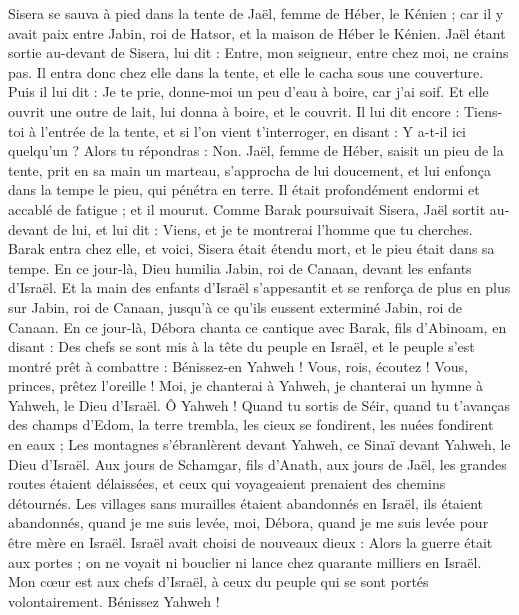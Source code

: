 \begin{multicols}{2}
Sisera se sauva à pied dans la tente de Jaël, femme de Héber, le Kénien ; car il y avait paix entre Jabin, roi de Hatsor, et la maison de Héber le Kénien.
Jaël étant sortie au-devant de Sisera, lui dit : Entre, mon seigneur, entre chez moi, ne crains pas. Il entra donc chez elle dans la tente, et elle le cacha sous une couverture.
Puis il lui dit : Je te prie, donne-moi un peu d'eau à boire, car j'ai soif. Et elle ouvrit une outre de lait, lui donna à boire, et le couvrit.
Il lui dit encore : Tiens-toi à l'entrée de la tente, et si l’on vient t’interroger, en disant : Y a-t-il ici quelqu'un ? Alors tu répondras : Non.
Jaël, femme de Héber, saisit un pieu de la tente, prit en sa main un marteau, s’approcha de lui doucement, et lui enfonça dans la tempe le pieu, qui pénétra en terre. Il était profondément endormi et accablé de fatigue ; et il mourut.
Comme Barak poursuivait Sisera, Jaël sortit au-devant de lui, et lui dit : Viens, et je te montrerai l'homme que tu cherches. Barak entra chez elle, et voici, Sisera était étendu mort, et le pieu était dans sa tempe.
En ce jour-là, Dieu humilia Jabin, roi de Canaan, devant les enfants d'Israël.
Et la main des enfants d'Israël s’appesantit et se renforça de plus en plus sur Jabin, roi de Canaan, jusqu'à ce qu'ils eussent  exterminé Jabin, roi de Canaan.
\VerseOne{}En ce jour-là, Débora chanta ce cantique avec Barak, fils d'Abinoam, en disant :
Des chefs se sont mis à la tête du peuple en Israël, et le peuple s’est montré prêt à combattre : Bénissez-en Yahweh !
Vous, rois, écoutez ! Vous, princes, prêtez l'oreille !  Moi, je chanterai à Yahweh, je chanterai un hymne à Yahweh, le Dieu d'Israël.
Ô Yahweh ! Quand tu sortis de Séir, quand tu t’avanças des champs d'Edom, la terre trembla, les cieux se fondirent, les nuées fondirent en eaux ;
Les montagnes s'ébranlèrent devant Yahweh, ce Sinaï devant Yahweh, le Dieu d'Israël.
Aux jours de Schamgar, fils d’Anath, aux jours de Jaël, les grandes routes étaient délaissées, et ceux qui voyageaient prenaient des chemins détournés.
Les villages sans murailles étaient abandonnés en Israël, ils étaient abandonnés, quand je me suis levée, moi, Débora, quand je me suis levée pour être mère en Israël.
Israël avait choisi de nouveaux dieux : Alors la guerre était aux portes ; on ne voyait ni bouclier ni lance chez quarante milliers en Israël.
Mon cœur est aux chefs d'Israël, à ceux du peuple qui se sont portés volontairement. Bénissez Yahweh !

\end{multicols}
